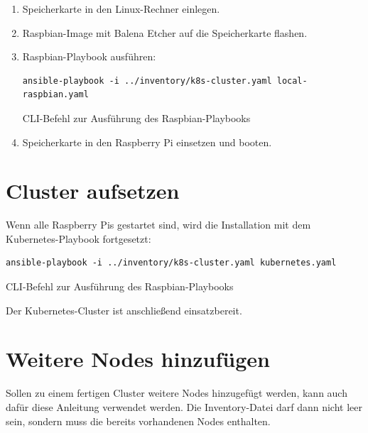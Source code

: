 \begin{enumerate}
    \item Speicherkarte in den Linux-Rechner einlegen.
    \item Raspbian-Image mit Balena Etcher auf die Speicherkarte flashen.
    \item Raspbian-Playbook ausführen:
        \begin{lstlisting}
ansible-playbook -i ../inventory/k8s-cluster.yaml local-raspbian.yaml
        \end{lstlisting}
        \caption{CLI-Befehl zur Ausführung des Raspbian-Playbooks}
    \item Speicherkarte in den Raspberry Pi einsetzen und booten.
\end{enumerate}

\section{Cluster aufsetzen}\label{sec:cluster-aufsetzen}

Wenn alle Raspberry Pis gestartet sind, wird die Installation mit dem Kubernetes-Playbook fortgesetzt:
\begin{lstlisting}
ansible-playbook -i ../inventory/k8s-cluster.yaml kubernetes.yaml
\end{lstlisting}
\caption{CLI-Befehl zur Ausführung des Raspbian-Playbooks}

Der Kubernetes-Cluster ist anschließend einsatzbereit.

\section{Weitere Nodes hinzufügen}\label{sec:weitere-nodes-hinzufügen}

Sollen zu einem fertigen Cluster weitere Nodes hinzugefügt werden, kann auch dafür diese Anleitung verwendet werden.
Die Inventory-Datei darf dann nicht leer sein, sondern muss die bereits vorhandenen Nodes enthalten.

